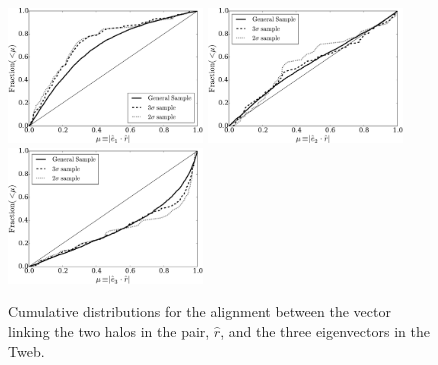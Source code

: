 \documentclass{emulateapj}
\begin{document}
\begin{figure}
\begin{center}
  \includegraphics[width=0.46\textwidth]{alignments_e1_r_all_environments.pdf} 
  \includegraphics[width=0.46\textwidth]{alignments_e2_r_all_environments.pdf} 
  \includegraphics[width=0.46\textwidth]{alignments_e3_r_all_environments.pdf} 
\end{center}
\caption{Cumulative distributions for the alignment between the vector
  linking the two halos in the pair, $\hat{r}$, and the three
  eigenvectors in the Tweb.
    \label{fig:alignment_r}}  
\end{figure}


\end{document}
